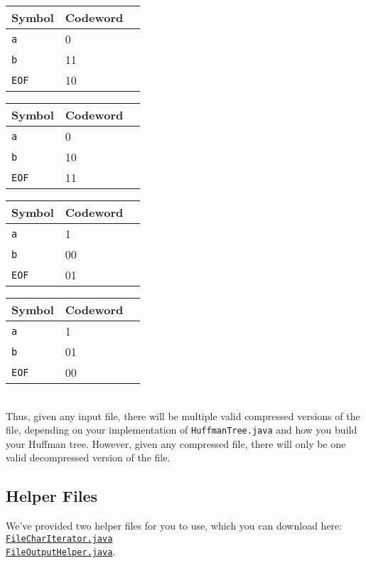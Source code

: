 \documentclass[11pt]{article}
\begin{document}
\begin{tabular}{| m{1.4cm} | m{1.5cm}| @{}m{0pt}@{}}
\hline
Symbol & Codeword & \\[8pt] \hline
\texttt{a} & 0 & \\[8pt]
\texttt{b} & 11 & \\[8pt]
\texttt{EOF} & 10 & \\ \hline
\end{tabular}
\quad
\begin{tabular}{| m{1.4cm} | m{1.5cm}| @{}m{0pt}@{}}
\hline
Symbol & Codeword & \\[8pt] \hline
\texttt{a} & 0 & \\[8pt]
\texttt{b} & 10 & \\[8pt]
\texttt{EOF} & 11 & \\ \hline
\end{tabular}
\quad
\begin{tabular}{| m{1.4cm} | m{1.5cm}| @{}m{0pt}@{}}
\hline
Symbol & Codeword & \\[8pt] \hline
\texttt{a} & 1 & \\[8pt]
\texttt{b} & 00 & \\[8pt]
\texttt{EOF} & 01 & \\ \hline
\end{tabular}
\quad
\begin{tabular}{| m{1.4cm} | m{1.5cm}| @{}m{0pt}@{}}
\hline
Symbol & Codeword & \\[8pt] \hline
\texttt{a} & 1 & \\[8pt]
\texttt{b} & 01 & \\[8pt]
\texttt{EOF} & 00 & \\ \hline
\end{tabular}\\

Thus, given any input file, there will be multiple valid compressed versions of the file, depending on your implementation of \texttt{HuffmanTree.java} and how you build your Huffman tree. However, given any compressed file, there will only be one valid decompressed version of the file.

\subsection*{Helper Files}

We've provided two helper files for you to use, which you can download here:\\
\href{http://inst.eecs.berkeley.edu/~cs61bl/code/proj2/FileCharIterator.java}{\color{blue}\texttt{FileCharIterator.java}}\\
\href{http://inst.eecs.berkeley.edu/~cs61bl/code/proj2/FileOutputHelper.java}{\color{blue}\texttt{FileOutputHelper.java}}.
\end{document}

